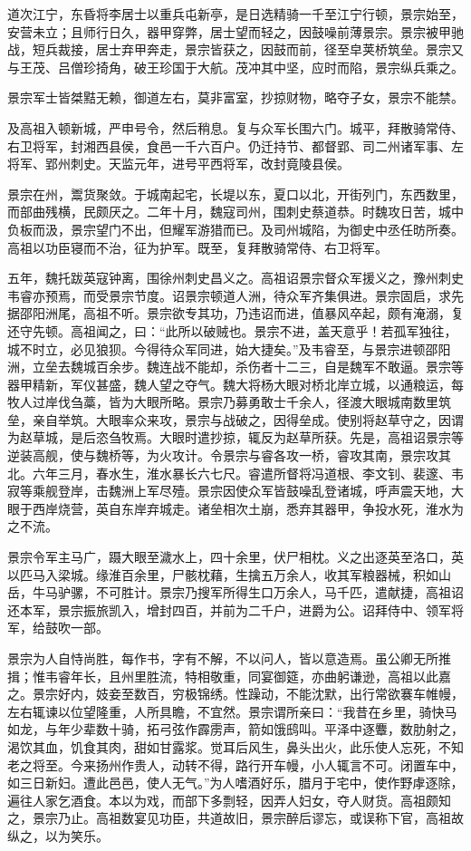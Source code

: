 \documentclass[12pt,UTF8]{ctexbook}
\begin{document}
道次江宁，东昏将李居士以重兵屯新亭，是日选精骑一千至江宁行顿，景宗始至，安营未立；且师行日久，器甲穿弊，居士望而轻之，因鼓噪前薄景宗。景宗被甲驰战，短兵裁接，居士弃甲奔走，景宗皆获之，因鼓而前，径至皁荚桥筑垒。景宗又与王茂、吕僧珍掎角，破王珍国于大航。茂冲其中坚，应时而陷，景宗纵兵乘之。

景宗军士皆桀黠无赖，御道左右，莫非富室，抄掠财物，略夺子女，景宗不能禁。

及高祖入顿新城，严申号令，然后稍息。复与众军长围六门。城平，拜散骑常侍、右卫将军，封湘西县侯，食邑一千六百户。仍迁持节、都督郢、司二州诸军事、左将军、郢州刺史。天监元年，进号平西将军，改封竟陵县侯。

景宗在州，鬻货聚敛。于城南起宅，长堤以东，夏口以北，开街列门，东西数里，而部曲残横，民颇厌之。二年十月，魏寇司州，围刺史蔡道恭。时魏攻日苦，城中负板而汲，景宗望门不出，但耀军游猎而已。及司州城陷，为御史中丞任昉所奏。高祖以功臣寝而不治，征为护军。既至，复拜散骑常侍、右卫将军。

五年，魏托跋英寇钟离，围徐州刺史昌义之。高祖诏景宗督众军援义之，豫州刺史韦睿亦预焉，而受景宗节度。诏景宗顿道人洲，待众军齐集俱进。景宗固启，求先据邵阳洲尾，高祖不听。景宗欲专其功，乃违诏而进，值暴风卒起，颇有淹溺，复还守先顿。高祖闻之，曰：“此所以破贼也。景宗不进，盖天意乎！若孤军独往，城不时立，必见狼狈。今得待众军同进，始大捷矣。”及韦睿至，与景宗进顿邵阳洲，立垒去魏城百余步。魏连战不能却，杀伤者十二三，自是魏军不敢逼。景宗等器甲精新，军仪甚盛，魏人望之夺气。魏大将杨大眼对桥北岸立城，以通粮运，每牧人过岸伐刍藁，皆为大眼所略。景宗乃募勇敢士千余人，径渡大眼城南数里筑垒，亲自举筑。大眼率众来攻，景宗与战破之，因得垒成。使别将赵草守之，因谓为赵草城，是后恣刍牧焉。大眼时遣抄掠，辄反为赵草所获。先是，高祖诏景宗等逆装高舰，使与魏桥等，为火攻计。令景宗与睿各攻一桥，睿攻其南，景宗攻其北。六年三月，春水生，淮水暴长六七尺。睿遣所督将冯道根、李文钊、裴邃、韦寂等乘舰登岸，击魏洲上军尽殪。景宗因使众军皆鼓噪乱登诸城，呼声震天地，大眼于西岸烧营，英自东岸弃城走。诸垒相次土崩，悉弃其器甲，争投水死，淮水为之不流。

景宗令军主马广，蹑大眼至濊水上，四十余里，伏尸相枕。义之出逐英至洛口，英以匹马入梁城。缘淮百余里，尸骸枕藉，生擒五万余人，收其军粮器械，积如山岳，牛马驴骡，不可胜计。景宗乃搜军所得生口万余人，马千匹，遣献捷，高祖诏还本军，景宗振旅凯入，增封四百，并前为二千户，进爵为公。诏拜侍中、领军将军，给鼓吹一部。

景宗为人自恃尚胜，每作书，字有不解，不以问人，皆以意造焉。虽公卿无所推揖；惟韦睿年长，且州里胜流，特相敬重，同宴御筵，亦曲躬谦逊，高祖以此嘉之。景宗好内，妓妾至数百，穷极锦绣。性躁动，不能沈默，出行常欲褰车帷幔，左右辄谏以位望隆重，人所具瞻，不宜然。景宗谓所亲曰：“我昔在乡里，骑快马如龙，与年少辈数十骑，拓弓弦作霹雳声，箭如饿鸱叫。平泽中逐麞，数肋射之，渴饮其血，饥食其肉，甜如甘露浆。觉耳后风生，鼻头出火，此乐使人忘死，不知老之将至。今来扬州作贵人，动转不得，路行开车幔，小人辄言不可。闭置车中，如三日新妇。遭此邑邑，使人无气。”为人嗜酒好乐，腊月于宅中，使作野虖逐除，遍往人家乞酒食。本以为戏，而部下多剽轻，因弄人妇女，夺人财货。高祖颇知之，景宗乃止。高祖数宴见功臣，共道故旧，景宗醉后谬忘，或误称下官，高祖故纵之，以为笑乐。
\end{document}
